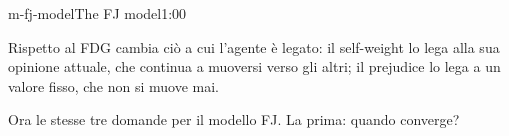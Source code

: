 \begin{slide}{m-fj-model}{The FJ model}{1:00}
\begin{discorso}
    \item {\color{red}  } {\color{blue}Rispetto al FDG cambia ciò a cui l'agente è legato:} il {\color{red}   } self-weight {\color{blue}lo} lega {\color{red} } alla sua opinione attuale, che {\color{red}  } {\color{blue}continua a muoversi} verso gli altri; {\color{red} } {\color{blue}il prejudice} lo lega a {\color{red} } {\color{blue}un valore fisso,} che non si muove mai.
    \item {\color{red}   } {\color{blue}Ora le stesse tre domande per il modello FJ. La prima:} quando converge?
  \end{discorso}
\end{slide}

